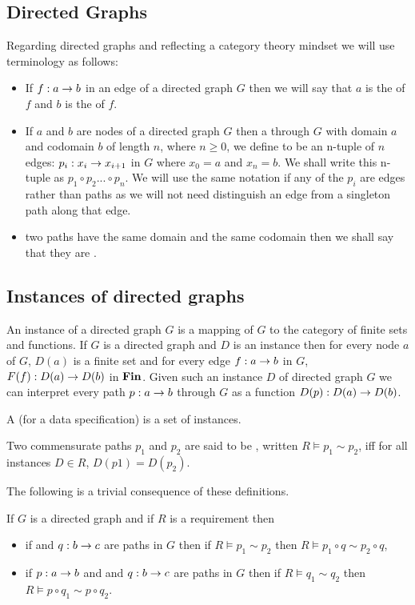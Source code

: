 \subsection{Directed Graphs}
Regarding directed graphs and reflecting a category theory mindset we will use terminology as follows:
\begin{itemize}
\item
 If $f: a \rightarrow b$ in an edge of a directed graph $G$ then we will say that $a$ is the  of $f$ and $b$ is the  of $f$.
\item
If $a$ and $b$ are nodes of a directed graph $G$ then a  through $G$ with domain $a$ and 
codomain $b$ of length $n$, where $n \geq 0$, we define to be  an n-tuple of  $n$ edges: $p_i: x_i \rightarrow x_{i+1} $ in $G$ where $x_0=a$ and $x_n=b$. We shall write this n-tuple as $p_1 \circ p_2... \circ p_n$. 
We will use the same notation if any of the $p_i$ are edges rather than paths as we will not need distinguish  an edge from a singleton path along that edge. 
\item two paths have the same domain and the same codomain then we shall say that they are .
\end{itemize}

\subsection{Instances of directed graphs}
An instance of a directed graph $G$ is a mapping of $G$ to the category of finite sets and functions.
If $G$ is a directed graph and $D$ is an instance then for every node $a$ of $G$, $D(a)$ is a finite set
and for every edge $f:a \rightarrow b$ in $G$, $F(f):D(a) \rightarrow D(b)$ in $\textbf{Fin}$. Given such an instance $D$ of 
directed graph $G$ we can interpret every path $p:a \rightarrow b$ through $G$ as a function $D(p): D(a) \rightarrow D(b)$.

A  (for a data specification) is a set of instances. 

Two commensurate paths $p_1$ and $p_2$ are  said to be , 
written $R \models p_1 \sim p_2$, iff 
for all instances $D \in R$, $D(p1)=D(p_2)$.

The following is a trivial consequence of these definitions.
\begin{lemma}
\label{pathequivalenceinference}
If $G$ is a directed graph and if $R$ is a requirement then 
\begin{itemize}
\item if  and $q: b \rightarrow c$ are paths in $G$ then if $R \models p_1 \sim p_2$  
then $R \models p_1 \circ q \sim p_2 \circ q$,
\item if $p: a \rightarrow b$ and  and $q: b \rightarrow c$ are paths in $G$ then if $R \models q_1 \sim q_2$  
then $R \models p \circ q_1 \sim p \circ q_2$.
\end{itemize}
\end{lemma}


